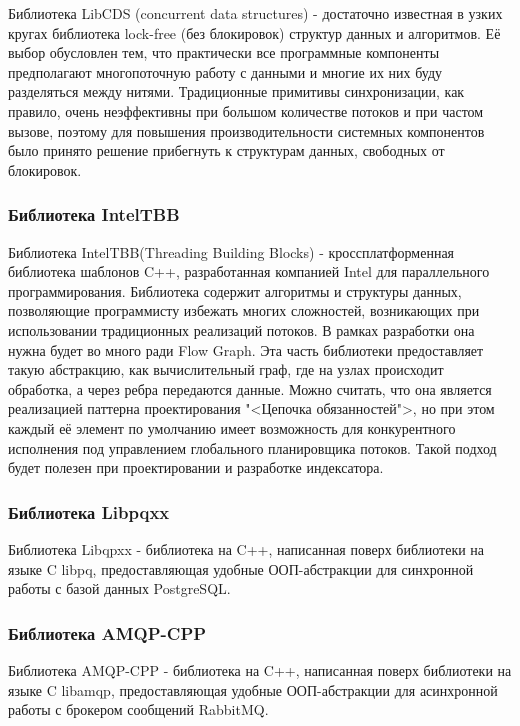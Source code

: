Библиотека LibCDS (concurrent data structures) - достаточно известная в узких кругах библиотека lock-free (без блокировок) структур данных и алгоритмов. Её выбор обусловлен тем, что практически все программные компоненты предполагают многопоточную работу с данными и многие их них буду разделяться между нитями. Традиционные примитивы синхронизации, как правило, очень неэффективны при большом количестве потоков и при частом вызове, поэтому для повышения производительности системных компонентов было принято решение прибегнуть к структурам данных, свободных от блокировок.

\subsubsection{Библиотека IntelTBB}

Библиотека IntelTBB(Threading Building Blocks) - кроссплатформенная библиотека шаблонов C++, разработанная компанией Intel для параллельного программирования. Библиотека содержит алгоритмы и структуры данных, позволяющие программисту избежать многих сложностей, возникающих при использовании традиционных реализаций потоков. В рамках разработки она нужна будет во много ради Flow Graph. Эта часть библиотеки предоставляет такую абстракцию, как вычислительный граф, где на узлах происходит обработка, а через ребра передаются данные. Можно считать, что она является реализацией паттерна проектирования "<Цепочка обязанностей">, но при этом каждый её элемент по умолчанию имеет возможность для конкурентного исполнения под управлением глобального планировщика потоков. Такой подход будет полезен при проектировании и разработке индексатора.

\subsubsection{Библиотека Libpqxx}

Библиотека Libqpxx - библиотека на C++, написанная поверх библиотеки на языке C libpq, предоставляющая удобные ООП-абстракции для синхронной работы с базой данных PostgreSQL.

\subsubsection{Библиотека AMQP-CPP}

Библиотека AMQP-CPP - библиотека на C++, написанная поверх библиотеки на языке C libamqp, предоставляющая удобные ООП-абстракции для асинхронной работы с брокером сообщений RabbitMQ.

